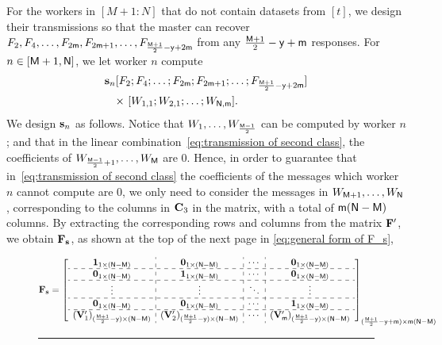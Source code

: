 \documentclass[conference,letterpaper]{IEEEtran}
\begin{document}
For the workers in $[M+1 : N]$ that do not contain datasets from $[t]$, we design their transmissions so that the master can recover $F_2, F_4, \ldots, F_{2{\sf m}}, F_{2{\sf m}+1}, \ldots, F_{\frac{{\sf M}+1}{2} - {\sf y} + 2{\sf m}}$ from any $\frac{{\sf M}+1}{2} - {\sf y} + {\sf m}$ responses.
 For $n \in [{\sf M}+1, {\sf N}]$, we let worker $n$ compute
\begin{align}
{\bf s}_n  & [ F_2; F_4; \ldots; F_{2{\sf m}}; F_{2{\sf m}+1}; \ldots; F_{\frac{{\sf M}+1}{2} - {\sf y} + 2{\sf m}} ]  \nonumber \\
& \text{× }  [ W_{1,1}; W_{2,1}; \ldots; W_{{\sf N},{\sf m}} ] .
\label{eq:transmission of second class}
\end{align}
We design ${\bf s}_{n} $ as follows.
Notice that $W_1, \ldots, W_{\frac{{\sf M}-1}{2}}$ can be computed by worker $n$; and that in the linear combination~\eqref{eq:transmission of second class}, the coefficients of $W_{\frac{{\sf M}-1}{2}+1}, \ldots, W_{{\sf M}}$ are $0$. 
Hence, in order to guarantee that in~\eqref{eq:transmission of second class} the coefficients of the messages which worker $n$ cannot compute are $0$, we only need to consider the messages in $W_{{\sf M}+1}, \ldots, W_{{\sf N}}$, corresponding to the columns in ${\bf C}_3$ in the matrix, with a total of ${\sf m} ({\sf N} - {\sf M})$ columns.
By extracting the corresponding rows and columns from the matrix \( {\bf F}' \), we obtain \( {\bf F}_{\bf s} \), as shown at the top of the next page in \eqref{eq:general form of F_s},
\begin{figure}
\begin{equation}
 {\bf F}_{\bf s} = 
\left[
\begin{array}{c:c:c:c}
{\bf 1}_{1 \times (\Nsf-\Msf)}  & {\bf 0}_{1 \times (\Nsf-\Msf)}  & \cdots & {\bf 0}_{1 \times (\Nsf-\Msf)}   \\ \hdashline
{\bf 0}_{1 \times (\Nsf-\Msf)} &  {\bf 1}_{1 \times (\Nsf-\Msf)}   & \cdots & {\bf 0}_{1 \times (\Nsf-\Msf)}   \\ \hdashline 
 \vdots   & \vdots  &  \ddots & \vdots \\ \hdashline
 {\bf 0}_{1 \times (\Nsf-\Msf)} &   {\bf 0}_{1 \times (\Nsf-\Msf)}    & \cdots &  {\bf 1}_{1 \times (\Nsf-\Msf)} \\ \hdashline
 ({\bf V}'_{1})_{ (\frac{\Msf + 1}{2} - \ysf) \times (\Nsf-\Msf)}  &  ({\bf V}'_{2})_{ (\frac{\Msf + 1}{2} - \ysf) \times (\Nsf-\Msf)}  &   \cdots   &   ({\bf V}'_{\msf})_{ (\frac{\Msf + 1}{2} - \ysf) \times (\Nsf-\Msf)} 
 \end{array}
\right]_{(\frac{\Msf + 1}{2} - \ysf + \msf) \times \msf(\Nsf-\Msf)}
\label{eq:general form of F_s}
\end{equation}
\rule{\textwidth}{0.2pt} %
\end{figure}
\end{document}
